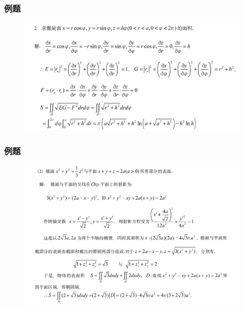\documentclass[xetex]{beamer}
\begin{document}
\begin{frame}
    \frametitle{例题}
    \begin{figure}[ht]
        \centering %
       \includegraphics[width=1.2\textwidth]{img/b.jpg}
    \end{figure}
\end{frame}

\begin{frame}
    \frametitle{例题}
    \begin{figure}[ht]
        \centering %
       \includegraphics[width=1.1\textwidth]{img/c.jpg}
    \end{figure}
\end{frame}
\end{document}
